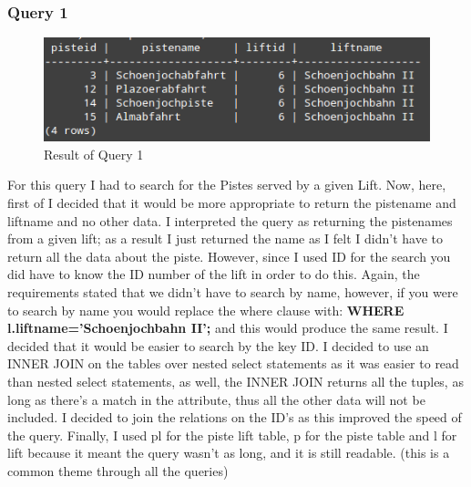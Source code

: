 \documentclass[12pt]{article}
\begin{document}
\subsubsection{Query 1}

\begin{figure}[htp]
\begin{adjustwidth}{-0cm}{0cm}
\centering
\includegraphics[scale=0.80]{Screenshots/query1upd(copy).png}
\caption{Result of Query 1}
\label{Query 1}
\end{adjustwidth}
\end{figure}
For this query I had to search for the Pistes served by a given Lift. Now, here, first of I decided that it would be more appropriate to return the pistename and liftname and no other data. I interpreted the query as returning the pistenames from a given lift; as a result I just returned the name as I felt I didn't have to return all the data about the piste. However, since I used ID for the search you did have to know the ID number of the lift in order to do this. Again, the requirements stated that we didn't have to search by name, however, if you were to search by name you would replace the where clause with: \textbf{WHERE l.liftname='Schoenjochbahn II';} and this would produce the same result. I decided that it would be easier to search by the key ID. I decided to use an INNER JOIN on the tables over nested select statements as it was easier to read than nested select statements, as well, the INNER JOIN returns all the tuples, as long as there's a match in the attribute, thus all the other data will not be included. I decided to join the relations on the ID's as this improved the speed of the query. Finally, I used pl for the piste lift table, p for the piste table and l for lift because it meant the query wasn't as long, and it is still readable. (this is a common theme through all the queries)
\end{document}
